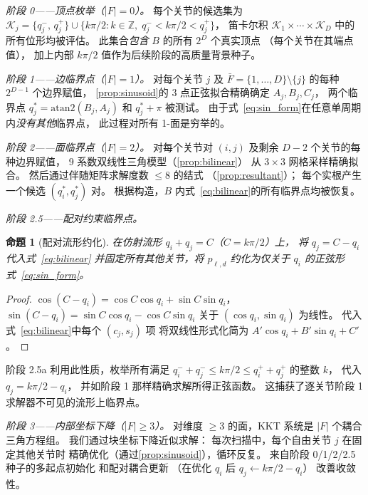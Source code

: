 \documentclass[journal]{IEEEtran}
\newtheorem{proposition}{命题}
\begin{document}
\emph{阶段 0——顶点枚举（$|F|=0$）。}
每个关节的候选集为
$\mathcal{K}_j = \{q_j^-,\, q_j^+\}
\cup \{ k\pi/2 : k\in \mathbb{Z},\;
q_j^- < k\pi/2 < q_j^+ \}$，
笛卡尔积 $\mathcal{K}_1 \times \cdots \times \mathcal{K}_D$
中的所有位形均被评估。
此集合\emph{包含} $B$ 的所有 $2^D$ 个真实顶点
（每个关节在其端点值），
加上内部 $k\pi/2$ 值作为后续阶段的高质量背景种子。

\emph{阶段 1——边临界点（$|F|=1$）。}
对每个关节 $j$ 及 $\bar F = \{1,\ldots,D\}\setminus\{j\}$
的每种 $2^{D-1}$ 个边界赋值，
\cref{prop:sinusoid}的 3 点正弦拟合精确确定
$A_j, B_j, C_j$，
两个临界点 $q_j^* = \mathrm{atan2}(B_j,A_j)$
和 $q_j^*+\pi$ 被测试。
由于式~\eqref{eq:sin_form}在任意单周期内\emph{没有其他}临界点，
此过程对所有 1-面是穷举的。

\emph{阶段 2——面临界点（$|F|=2$）。}
对每个关节对 $(i,j)$ 及剩余 $D{-}2$ 个关节的每种边界赋值，
9 系数双线性三角模型（\cref{prop:bilinear}）
从 $3{\times}3$ 网格采样精确拟合。
然后通过伴随矩阵求解度数 $\leq 8$ 的结式
（\cref{prop:resultant}）；
每个实根产生一个候选 $(q_i^*,q_j^*)$ 对。
根据构造，$B$ 内式~\eqref{eq:bilinear}的所有临界点均被恢复。

\emph{阶段 2.5——配对约束临界点。}
\begin{proposition}[配对流形约化]\label{prop:pair_reduce}
在仿射流形 $q_i + q_j = C$（$C = k\pi/2$）上，
将 $q_j = C - q_i$ 代入式~\eqref{eq:bilinear}
并固定所有其他关节，将 $p_{\ell,d}$
约化为仅关于 $q_i$ 的正弦形式~\eqref{eq:sin_form}。
\end{proposition}
\begin{proof}
$\cos(C-q_i) = \cos C \cos q_i + \sin C \sin q_i$，
$\sin(C-q_i) = \sin C \cos q_i - \cos C \sin q_i$
关于 $(\cos q_i, \sin q_i)$ 为线性。
代入式~\eqref{eq:bilinear}中每个 $(c_j, s_j)$ 项
将双线性形式化简为 $A'\cos q_i + B'\sin q_i + C'$。
\end{proof}
阶段 2.5a 利用此性质，枚举所有满足
$q_i^- + q_j^- \leq k\pi/2 \leq q_i^+ + q_j^+$ 的整数 $k$，
代入 $q_j = k\pi/2 - q_i$，
并如阶段 1 那样精确求解所得正弦函数。
这捕获了逐关节阶段 1 求解器不可见的流形上临界点。

\emph{阶段 3——内部坐标下降（$|F|\geq 3$）。}
对维度 $\geq 3$ 的面，KKT 系统是 $|F|$ 个耦合三角方程组。
我们通过块坐标下降近似求解：
每次扫描中，每个自由关节 $j$ 在固定其他关节时
精确优化（通过\cref{prop:sinusoid}），循环反复。
来自阶段 0/1/2/2.5 种子的多起点初始化
和配对耦合更新
（在优化 $q_i$ 后 $q_j \leftarrow k\pi/2 - q_i$）
改善收敛性。

\end{document}
